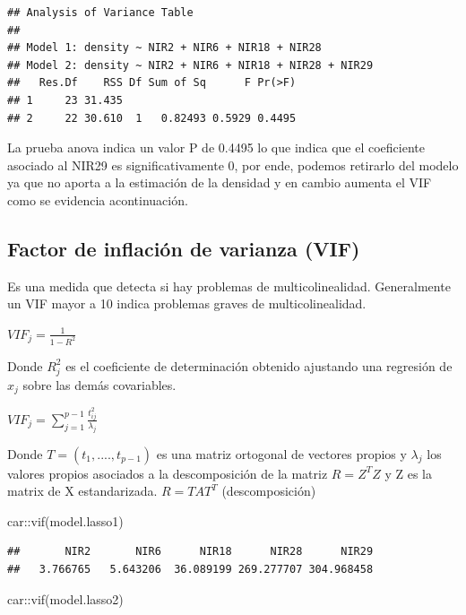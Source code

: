\documentclass[
]{article}
\newenvironment{Shaded}{\begin{snugshade}}{\end{snugshade}}
\newcommand{\FunctionTok}[1]{\textcolor[rgb]{0.00,0.00,0.00}{#1}}
\newcommand{\NormalTok}[1]{#1}
\newcommand{\SpecialCharTok}[1]{\textcolor[rgb]{0.00,0.00,0.00}{#1}}
\begin{document}
\begin{verbatim}
## Analysis of Variance Table
## 
## Model 1: density ~ NIR2 + NIR6 + NIR18 + NIR28
## Model 2: density ~ NIR2 + NIR6 + NIR18 + NIR28 + NIR29
##   Res.Df    RSS Df Sum of Sq      F Pr(>F)
## 1     23 31.435                           
## 2     22 30.610  1   0.82493 0.5929 0.4495
\end{verbatim}

La prueba anova indica un valor P de 0.4495 lo que indica que el
coeficiente asociado al NIR29 es significativamente 0, por ende, podemos
retirarlo del modelo ya que no aporta a la estimación de la densidad y
en cambio aumenta el VIF como se evidencia acontinuación.

\hypertarget{factor-de-inflaciuxf3n-de-varianza-vif}{%
\subsection{Factor de inflación de varianza
(VIF)}\label{factor-de-inflaciuxf3n-de-varianza-vif}}

Es una medida que detecta si hay problemas de multicolinealidad.
Generalmente un VIF mayor a 10 indica problemas graves de
multicolinealidad.

\(VIF_j = \frac{1}{1-R^2}\)

Donde \(R^2_j\) es el coeficiente de determinación obtenido ajustando
una regresión de \(x_j\) sobre las demás covariables.

\(VIF_j = \sum_{j=1}^{p-1}\frac{t^2_{ij}}{\lambda_j}\)

Donde \(T=(t_1,....,t_{p-1})\) es una matriz ortogonal de vectores
propios y \(\lambda_j\) los valores propios asociados a la
descomposición de la matriz \(R=Z^TZ\) y Z es la matrix de X
estandarizada. \(R=TAT^T\) (descomposición)

\begin{Shaded}
\begin{Highlighting}[]
\NormalTok{car}\SpecialCharTok{::}\FunctionTok{vif}\NormalTok{(model.lasso1)}
\end{Highlighting}
\end{Shaded}

\begin{verbatim}
##       NIR2       NIR6      NIR18      NIR28      NIR29 
##   3.766765   5.643206  36.089199 269.277707 304.968458
\end{verbatim}

\begin{Shaded}
\begin{Highlighting}[]
\NormalTok{car}\SpecialCharTok{::}\FunctionTok{vif}\NormalTok{(model.lasso2)}
\end{Highlighting}
\end{Shaded}
\end{document}
